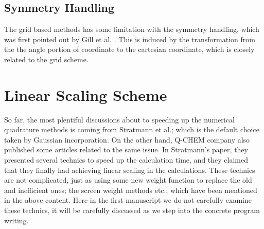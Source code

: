
\subsection{Symmetry Handling}
The grid based methods has some limitation with the symmetry
handling, which was first pointed out by Gill et al. \cite{PGPOPLE}.
This is induced by the transformation from the the angle portion of
coordinate to the cartesian coordinate, which is closely related to
the grid scheme.


\section{Linear Scaling Scheme}
So far, the most plentiful discussions about to speeding up the
numerical quadrature methods is coming from Stratmann et
al.\cite{EGM}; which is the default choice taken by Gaussian
incorporation\cite{g03}. On the other hand, Q-CHEM\cite{QCHEM}
company also published some articles related to the same
issue\cite{IncDFT}. In Stratmann's paper, they presented several
technics to speed up the calculation time, and they claimed that
they finally had achieving linear scaling in the calculations. These
technics are not complicated, just as using some new weight function
to replace the old and inefficient ones; the screen weight methods
etc.; which have been mentioned in the above content. Here in the
first manuscript we do not carefully examine these technics, it will
be carefully discussed as we step into the concrete program writing.



